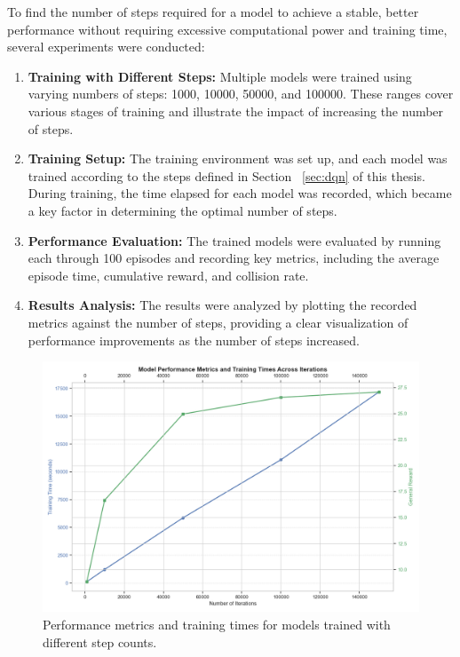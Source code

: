To find the number of steps required for a model to achieve a stable, better performance without requiring excessive computational power and training time, several experiments were conducted:

\begin{enumerate}
    \item \textbf{Training with Different Steps:} Multiple models were trained using varying numbers of steps: 1000, 10000, 50000, and 100000. These ranges cover various stages of training and illustrate the impact of increasing the number of steps.
    \item \textbf{Training Setup:} The training environment was set up, and each model was trained according to the steps defined in Section ~\ref{sec:dqn} of this thesis. During training, the time elapsed for each model was recorded, which became a key factor in determining the optimal number of steps.
    \item \textbf{Performance Evaluation:} The trained models were evaluated by running each through 100 episodes and recording key metrics, including the average episode time, cumulative reward, and collision rate.
    \item \textbf{Results Analysis:} The results were analyzed by plotting the recorded metrics against the number of steps, providing a clear visualization of performance improvements as the number of steps increased.
\end{enumerate}

\begin{figure}[H]
    \centering
    \includegraphics[width=\textwidth]{images/Iterations_plot_table.png}
    \caption{Performance metrics and training times for models trained with different step counts.}
    \label{fig:iterations_plot}
\end{figure}

